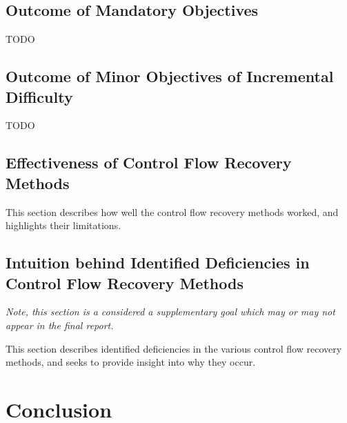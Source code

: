 \documentclass[12pt, a4paper]{article}
\begin{document}

\subsection{Outcome of Mandatory Objectives}

TODO


\subsection{Outcome of Minor Objectives of Incremental Difficulty}

TODO



\subsection{Effectiveness of Control Flow Recovery Methods}

This section describes how well the control flow recovery methods worked, and highlights their limitations.


\subsection{Intuition behind Identified Deficiencies in Control Flow Recovery Methods}

\textit{Note, this section is a considered a supplementary goal which may or may not appear in the final report.}

This section describes identified deficiencies in the various control flow recovery methods, and seeks to provide insight into why they occur.

\clearpage


\section{Conclusion}
\end{document}
